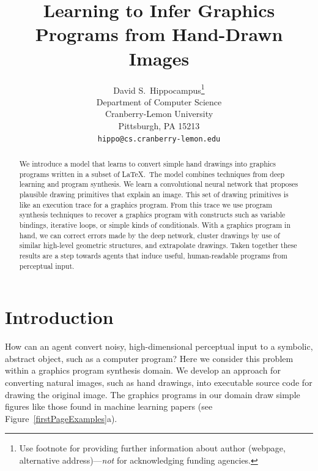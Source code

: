 \documentclass{article}
\title{Learning to Infer Graphics Programs from Hand-Drawn Images}
\author{
  David S.~Hippocampus\thanks{Use footnote for providing further
    information about author (webpage, alternative
    address)---\emph{not} for acknowledging funding agencies.} \\
  Department of Computer Science\\
  Cranberry-Lemon University\\
  Pittsburgh, PA 15213 \\
  \texttt{hippo@cs.cranberry-lemon.edu} \\
}
\newcommand{\remark}[1]{\textcolor{red}{[#1]}}
\begin{document}

\maketitle

\begin{abstract}
  We introduce a model that learns to convert simple hand drawings
  into graphics programs written in a subset of \LaTeX.~The model
  combines techniques from deep learning and program synthesis.  We
  learn a convolutional neural network that proposes plausible drawing primitives
  that explain an image. This set of drawing primitives is like an execution trace for a graphics program. From this trace we use
  program synthesis techniques to recover a graphics
  program with constructs such as variable bindings, iterative loops, or
  simple kinds of conditionals. With a graphics program in hand,
  we can correct errors made by the deep network, cluster drawings by use of similar high-level geometric structures, and extrapolate drawings.
  Taken together these results are a step towards
  agents that induce useful, human-readable programs from perceptual input.  
\end{abstract}

\section{Introduction}

 How can an agent convert noisy, high-dimensional perceptual input
 to a symbolic, abstract object, such as a computer program?  Here we
 consider this problem within a graphics program synthesis domain.  We
 develop an approach for converting natural images, such as hand
 drawings, into executable source code for drawing the original image.
 The graphics programs in our domain draw simple figures like those found in
 machine learning papers (see Figure~\ref{firstPageExamples}a).
\end{document}
